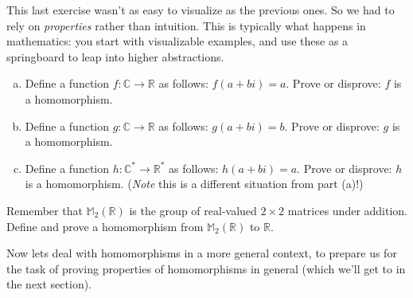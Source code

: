\begin{rem}
This last exercise wasn't as easy to visualize as the previous ones.  So we had to rely on \emph{properties} rather than intuition. This is typically what happens in mathematics: you start with visualizable examples, and use these as a springboard to leap into higher abstractions.
\end{rem}

\begin{exercise}\label{exercise:homomorph:homo_GL2_a}
\begin{enumerate}[(a)]
\item
Define a function $f: {\mathbb C} \rightarrow {\mathbb R }$ as follows: $f(a+bi) = a$.  Prove or disprove:  $f$ is a  homomorphism.
\item
Define a function $g: {\mathbb C} \rightarrow {\mathbb R }$ as follows: $g(a+bi) = b$.  Prove or disprove:  $g$ is a homomorphism.
\item
Define a function $h: {\mathbb C}^* \rightarrow {\mathbb R }^*$ as follows: $h(a+bi) = a$.  Prove or disprove:  $h$ is a  homomorphism. (\emph{Note} this is a different situation from part (a)!) 
\end{enumerate}
\end{exercise}

\begin{exercise}\label{exercise:homomorph:2x2_add}
Remember that  ${\mathbb M}_2( {\mathbb R})$ is the group of real-valued $2 \times 2$ matrices under addition.  Define and prove a homomorphism from ${\mathbb M}_2( {\mathbb R})$ to ${\mathbb R}$.
\end{exercise}

Now lets deal with homomorphisms in a more general context, to prepare us for the task of proving  properties of homomorphisms in general (which we'll get to in the next section).
 
